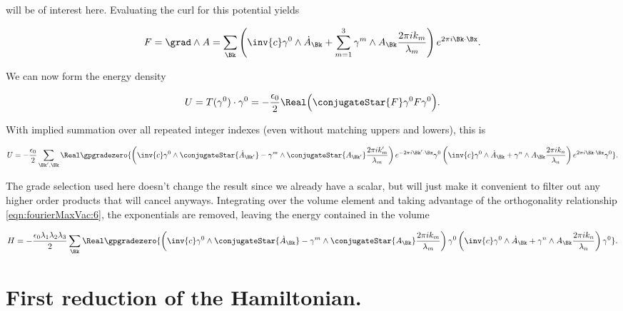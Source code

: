 will be of interest here.  Evaluating the curl for this potential yields

\begin{align}\label{eqn:fourierMaxVac:8}
F = \grad \wedge A
= \sum_{\Bk} \left( \inv{c} \gamma^0 \wedge \dot{A}_\Bk + \sum_{m=1}^3 \gamma^m \wedge A_\Bk \frac{2 \pi i k_m}{\lambda_m} \right) e^{2 \pi i \Bk \cdot \Bx}.
\end{align}

We can now form the energy density

\begin{align}\label{eqn:fourierMaxVac:9}
U = T(\gamma^0) \cdot \gamma^0
=
-\frac{\epsilon_0}{2} \Real \Bigl( \conjugateStar{F} \gamma^0 F \gamma^0 \Bigr).
\end{align}

With implied summation over all repeated integer indexes (even without matching uppers and lowers), this is

\begin{align}\label{eqn:fourierMaxVac:10}
U =
-\frac{\epsilon_0}{2} \sum_{\Bk', \Bk} \Real \gpgradezero{
\left( \inv{c} \gamma^0 \wedge \conjugateStar{\dot{A}_{\Bk'}} - \gamma^m \wedge \conjugateStar{A_{\Bk'}} \frac{2 \pi i k_m'}{\lambda_m} \right) e^{-2 \pi i \Bk' \cdot \Bx}
\gamma^0
\left( \inv{c} \gamma^0 \wedge \dot{A}_\Bk + \gamma^n \wedge A_\Bk \frac{2 \pi i k_n}{\lambda_n} \right) e^{2 \pi i \Bk \cdot \Bx}
\gamma^0
}.
\end{align}

The grade selection used here doesn't change the result since we already have a scalar, but will just make it convenient to filter out any higher order products that will cancel anyways.  Integrating over the volume element and taking advantage of the orthogonality relationship \autoref{eqn:fourierMaxVac:6}, the exponentials are removed, leaving the energy contained in the volume

\begin{align}
\label{eqn:fourierMaxVac:11}
H = %
-\frac{\epsilon_0 \lambda_1 \lambda_2 \lambda_3}{2}
\sum_{\Bk} \Real 
\gpgradezero{
\left( \inv{c} \gamma^0 \wedge \conjugateStar{\dot{A}_{\Bk}} - \gamma^m \wedge \conjugateStar{A_{\Bk}} \frac{2 \pi i k_m}{\lambda_m} \right) 
\gamma^0
\left( \inv{c} \gamma^0 \wedge \dot{A}_\Bk + \gamma^n \wedge A_\Bk \frac{2 \pi i k_n}{\lambda_n} \right) 
\gamma^0
}.
\end{align}

\section{First reduction of the Hamiltonian.}

